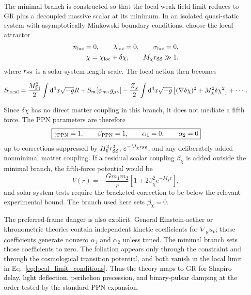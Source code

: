 \documentclass[aps,prd,reprint,nofootinbib,superscriptaddress,longbibliography]{revtex4-2}
\newcommand{\dd}{\mathrm{d}}
\newcommand{\mpl}{M_{\rm Pl}}
\begin{document}
The minimal branch is constructed so that the local weak-field limit reduces to GR plus a decoupled massive scalar at its minimum.  In an isolated quasi-static system with asymptotically Minkowski boundary conditions, choose the local attractor
\begin{align}
  n_{\rm loc}=0,
  \qquad \lambda_{\rm loc}=0,
  \qquad \sigma_{\rm loc}=0,\label{eq:local_limit_conditions}\\
  \chi=\chi_{\rm loc}+\delta\chi,
  \qquad M_\chi r_{\rm SS}\gg1 .\nonumber
\end{align}
where $r_{\rm SS}$ is a solar-system length scale.  The local action then becomes
\begin{widetext}
\begin{equation}
  S_{\rm local}=\frac{\mpl^2}{2}\int\dd^4x\sqrt{-g}R
  +S_m[\psi_m,g_{\mu\nu}]
  -\frac{Z_\chi}{2}\int\dd^4x\sqrt{-g}\left[(\nabla\delta\chi)^2+M_\chi^2\delta\chi^2\right]
  +\cdots .
  \label{eq:local_action_GR}
\end{equation}
\end{widetext}
Since $\delta\chi$ has no direct matter coupling in this branch, it does not mediate a fifth force.  The PPN parameters are therefore
\begin{equation}
  \boxed{
  \gamma_{\rm PPN}=1,
  \qquad
  \beta_{\rm PPN}=1,
  \qquad
  \alpha_1=0,
  \qquad
  \alpha_2=0}
  \label{eq:PPN_results}
\end{equation}
up to corrections suppressed by $H_0^2r_{\rm SS}^2$, $e^{-M_\chi r_{\rm SS}}$, and any deliberately added nonminimal matter coupling.  If a residual scalar coupling $\beta_\chi$ is added outside the minimal branch, the fifth-force potential would be
\begin{equation}
  V(r)=-\frac{Gm_1m_2}{r}\left[1+2\beta_\chi^2e^{-M_\chi r}\right],
  \label{eq:fifth_force_potential}
\end{equation}
and solar-system tests require the bracketed correction to be below the relevant experimental bound.  The branch used here sets $\beta_\chi=0$.

The preferred-frame danger is also explicit.  General Einstein-aether or khronometric theories contain independent kinetic coefficients for $\nabla_\mu u_\nu$; those coefficients generate nonzero $\alpha_1$ and $\alpha_2$ unless tuned.  The minimal branch sets those coefficients to zero.  The foliation appears only through the constraint and through the cosmological transition potential, and both vanish in the local limit in Eq.~\eqref{eq:local_limit_conditions}.  Thus the theory maps to GR for Shapiro delay, light deflection, perihelion precession, and binary-pulsar damping at the order tested by the standard PPN expansion.
\end{document}
